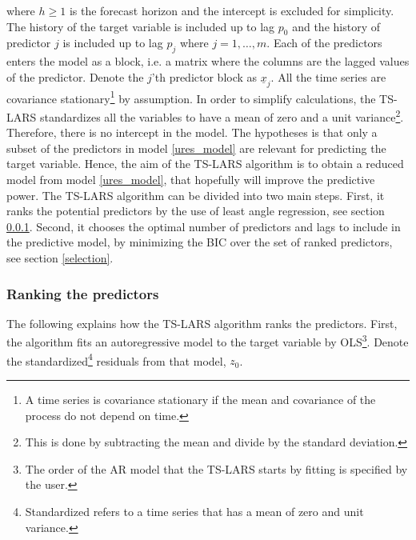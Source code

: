 \noindent where $h \geq 1$ is the forecast horizon and the intercept is excluded for simplicity. The history of the target variable is included up to lag $p_0$ and the history of predictor $j$ is included up to lag $p_j$ where $j = 1,  \ldots, m$. Each of the predictors enters the model as a block, i.e. a matrix where the columns are the lagged values of the predictor. Denote the $j$'th predictor block as $\underline{x}_j$. All the time series are covariance stationary\footnote{A time series is covariance stationary if the mean and covariance of the process do not depend on time.} by assumption. In order to simplify calculations, the TS-LARS standardizes all the variables to have a mean of zero and a unit variance\footnote{This is done by subtracting the mean and divide by the standard deviation.}. Therefore, there is no intercept in the model. The hypotheses is that only a subset of the predictors in model \eqref{ures_model} are relevant for predicting the target variable. Hence, the aim of the TS-LARS algorithm is to obtain a reduced model from model \eqref{ures_model}, that hopefully will improve the predictive power. The TS-LARS algorithm can be divided into two main steps. First, it ranks the potential predictors by the use of least angle regression, see section \ref{ranking}. Second, it chooses the optimal number of predictors and lags to include in the predictive model, by minimizing the BIC over the set of ranked predictors, see section \ref{selection}.



\subsubsection{Ranking the predictors}\label{ranking}

The following explains how the TS-LARS algorithm ranks the predictors. First, the algorithm fits an autoregressive model to the target variable by OLS\footnote{The order of the AR model that the TS-LARS starts by fitting is specified by the user.}. Denote the standardized\footnote{Standardized refers to a time series that has a mean of zero and unit variance.} residuals from that model, $z_0$.

